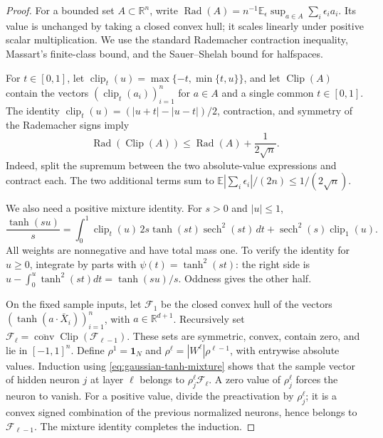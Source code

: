 \begin{proof}
For a bounded set $A\subset\mathbb R^n$, write
$\operatorname{Rad}(A)=n^{-1}\mathbb E_\epsilon
\sup_{a\in A}\sum_i\epsilon_i a_i$.
Its value is unchanged by taking a closed convex hull; it scales
linearly under positive scalar multiplication.  We use the standard
Rademacher contraction inequality, Massart's finite-class bound, and
the Sauer--Shelah bound for halfspaces.

For $t\in[0,1]$, let $\operatorname{clip}_t(u)=\max\{-t,\min\{t,u\}\}$,
and let $\operatorname{Clip}(A)$ contain the vectors
$(\operatorname{clip}_t(a_i))_{i=1}^n$ for $a\in A$ and a single common
$t\in[0,1]$.  The identity
$\operatorname{clip}_t(u)=(|u+t|-|u-t|)/2$, contraction, and symmetry of
the Rademacher signs imply
\begin{equation}
 \operatorname{Rad}(\operatorname{Clip}(A))
 \leq\operatorname{Rad}(A)+\frac1{2\sqrt n}.
 \label{eq:gaussian-variable-clip}
\end{equation}
Indeed, split the supremum between the two absolute-value expressions
and contract each.  The two additional terms sum to
$\mathbb E|\sum_i\epsilon_i|/(2n)\leq1/(2\sqrt n)$.

We also need a positive mixture identity.  For $s>0$ and $|u|\leq1$,
\begin{equation}
 \frac{\tanh(su)}s=
 \int_0^1\operatorname{clip}_t(u)\,
       2s\tanh(st)\operatorname{sech}^2(st)\,dt
 +\operatorname{sech}^2(s)\operatorname{clip}_1(u).
 \label{eq:gaussian-tanh-mixture}
\end{equation}
All weights are nonnegative and have total mass one.  To verify the
identity for $u\geq0$, integrate by parts with
$\psi(t)=\tanh^2(st)$: the right side is
$u-\int_0^u\tanh^2(st)dt=\tanh(su)/s$.  Oddness gives the other half.

On the fixed sample inputs, let $\mathcal F_1$ be the closed convex hull
of the vectors $(\tanh(a\cdot\bar X_i))_{i=1}^n$, with
$a\in\mathbb R^{d+1}$.  Recursively set
$\mathcal F_\ell=\overline{\operatorname{conv}}
\operatorname{Clip}(\mathcal F_{\ell-1})$.  These sets are symmetric,
convex, contain zero, and lie in $[-1,1]^n$.
Define $\rho^1=\boldsymbol1_N$ and
$\rho^\ell=|W^\ell|\rho^{\ell-1}$, with entrywise absolute values.
Induction using \eqref{eq:gaussian-tanh-mixture} shows that the sample
vector of hidden neuron $j$ at layer $\ell$ belongs to
$\rho^\ell_j\mathcal F_\ell$.  A zero value of $\rho^\ell_j$ forces the
neuron to vanish.  For a positive value, divide the preactivation by
$\rho^\ell_j$; it is a convex signed combination of the previous
normalized neurons, hence belongs to $\mathcal F_{\ell-1}$.  The mixture
identity completes the induction.


\end{proof}
